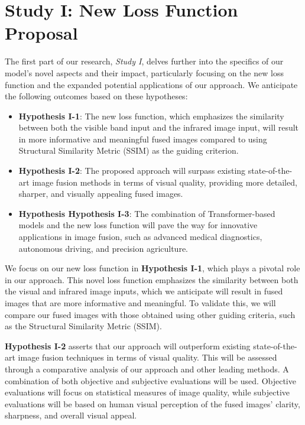 \section{Study I: New Loss Function Proposal}\label{sec:study2}

The first part of our research, \textit{Study I}, delves further into the specifics of our model's novel aspects and their impact, particularly focusing on the new loss function and the expanded potential applications of our approach. We anticipate the following outcomes based on these hypotheses:

\begin{itemize}
    \item \textbf{Hypothesis I-1}: The new loss function, which emphasizes the similarity between both the visible band input and the infrared image input, will result in more informative and meaningful fused images compared to using Structural Similarity Metric (SSIM) as the guiding criterion.
    
    \item \textbf{Hypothesis I-2}: The proposed approach will surpass existing state-of-the-art image fusion methods in terms of visual quality, providing more detailed, sharper, and visually appealing fused images.
    
    \item \textbf{Hypothesis Hypothesis I-3}: The combination of Transformer-based models and the new loss function will pave the way for innovative applications in image fusion, such as advanced medical diagnostics, autonomous driving, and precision agriculture.
\end{itemize}

We focus on our new loss function in \textbf{Hypothesis I-1}, which plays a pivotal role in our approach. This novel loss function emphasizes the similarity between both the visual and infrared image inputs, which we anticipate will result in fused images that are more informative and meaningful. To validate this, we will compare our fused images with those obtained using other guiding criteria, such as the Structural Similarity Metric (SSIM).

\textbf{Hypothesis I-2} asserts that our approach will outperform existing state-of-the-art image fusion techniques in terms of visual quality. This will be assessed through a comparative analysis of our approach and other leading methods. A combination of both objective and subjective evaluations will be used. Objective evaluations will focus on statistical measures of image quality, while subjective evaluations will be based on human visual perception of the fused images' clarity, sharpness, and overall visual appeal.

